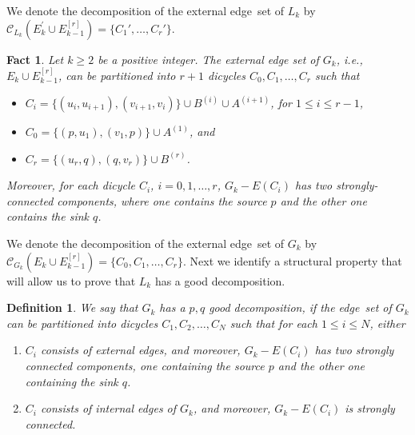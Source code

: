 \documentclass[11pt]{article}
\newtheorem{definition}[theorem]{Definition}
\newtheorem{fact}[theorem]{Fact}
\newcommand{\gdecomplong}[2]{\mathcal{C}_{#2}(#1)}
\begin{document}
We denote the decomposition of the external edge~set of $L_k$
by $\gdecomplong{E_k^{'}\cup E^{[r]}_{k-1}}{L_k}=\{C_1', \ldots, C_{r}'\}$. 

\begin{fact}
\label{fact:Gk-external}
Let $k\ge2$ be a positive integer.
The external edge set of $G_{k}$, i.e., $E_k \cup E^{[r]}_{k-1}$, can be
partitioned into $r+1$ dicycles $C_0, C_1, \ldots, C_{r}$ such that
\begin{itemize}
\item[]
	$C_i=\{(u_{i}, u_{i+1}), (v_{i+1}, v_{i})\}\cup
	B^{(i)}\cup A^{(i+1)}$, for $1\leq i\leq r-1$,
\item[]
	$C_0=\{(p, u_1), (v_1, p)\}\cup A^{(1)}$, and
\item[]
	$C_{r}=\{(u_{r}, q), (q, v_{r})\}\cup B^{(r)}$.
\end{itemize}
Moreover, for each dicycle $C_i$, $i=0,1,\dots,r$,
$G_{k}-E(C_i)$ has two strongly-connected components,
where one contains the source $p$ and
the other one contains the sink $q$.
\end{fact}

We denote the decomposition of the external edge~set of $G_k$
by $\gdecomplong{E_k\cup{E^{[r]}_{k-1}}}{G_k}=\{C_0,C_1, \ldots, C_{r}\}$. 
Next we identify a structural property that will allow us to prove that $L_k$ has a good decomposition. 

\begin{definition}\label{def: pq good decomposition}
We say that $G_k$ has a $p,q$ good decomposition, if the edge~set of $G_{k}$ can be partitioned into
dicycles $C_1, C_2, \ldots, C_N$ such that
for each $1\leq i\leq N$, either
\begin{enumerate}
\item[(1)] $C_i$ consists of external edges, 
and moreover,
$G_{k}-E(C_i)$ has two strongly connected components, one containing
the source $p$ and the other one containing the sink $q$.
\item[(2)] $C_i$ consists of internal edges of $G_k$, and moreover,
$G_{k}-E(C_i)$ is strongly connected.
\end{enumerate}
\end{definition}
\end{document}
